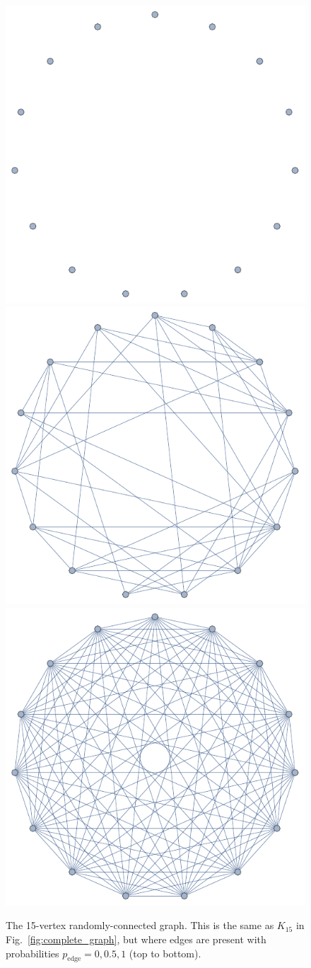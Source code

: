 \documentclass[aps,rmp,twocolumn,amsmath,amssymb,nofootinbib,superscriptaddress,longbibliography,floatfix,table-of-contents,eqsecnum]{revtex4-1}
\begin{document}
\begin{figure}[!htb]
\includegraphics[width=0.6\columnwidth]{random_0}
\includegraphics[width=0.6\columnwidth]{random_05}
\includegraphics[width=0.6\columnwidth]{random_1}
\caption{The 15-vertex randomly-connected graph. This is the same as $K_{15}$ in Fig.~\ref{fig:complete_graph}, but where edges are present with probabilities \mbox{$p_\text{edge}=0,0.5,1$} (top to bottom).} \label{fig:random_graph}
\end{figure}
\end{document}
